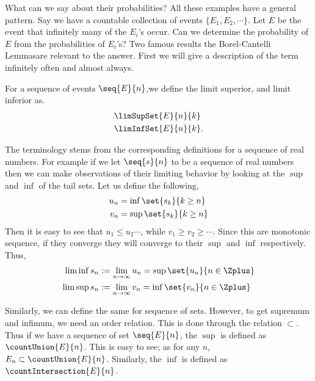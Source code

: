 What can we say about their probabilities? 
All these examples have a general pattern. Say we have a countable collection of events $\lbrace
E_1,E_2,\cdots\rbrace$. Let $E$ be the event that infinitely many of the $E_i$'s occur. Can we
determine the probability of $E$ from the probabilities of $E_i$'s? Two famous results{\textemdash} 
the Borel-Cantelli Lemmas{\textemdash}are relevant to the answer. First we will give a description of
the term infinitely often and almost always.

For a sequence of events $\seq{E}{n}$,we define the limit superior, and limit
inferior as.
\begin{align*}
    &\limSupSet{E}{n}{k} \\
    &\limInfSet{E}{n}{k}.
\end{align*}
\begin{Remark}\label{rmk:limsup_liminf_set}
    The terminology stems from the corresponding definitions for 
    a sequence of real numbers. For example if we let $\seq{s}{n}$ to be
    a sequence of real numbers then we can make observations of their limiting behavior by looking
    at the $\sup$ and $\inf$ of the tail sets. Let us define the following,
    \begin{align*}
	u_n &= \inf\set{s_k}{k\geq n} \\
	v_n &= \sup\set{s_k}{k\geq n} \\
    \end{align*}
    Then it is easy to see that $u_1 \leq u_2 \cdots$, while $v_1 \geq v_2 \geq \cdots$. Since this
    are monotonic sequence, if they converge they will converge to their $\sup$ and $\inf$
    respectively. Thus,
    \begin{align*}
	\liminf s_n & := \lim\limits_{n\to\infty}u_n = \sup\set{u_n}{n\in \Zplus} \\
	\limsup s_n & := \lim\limits_{n\to\infty}v_n = \inf\set{v_n}{n\in \Zplus} \\
    \end{align*}	
    
    Similarly, we can define the same for sequence of sets. However, to get supremum
    and infimum, we need an order relation. This is done through the relation $\subset$. Thus if we
    have a sequence of set $\seq{E}{n}$, the $\sup$ is defined as $\countUnion{E}{n}$. This is easy
    to see; as for any $n$, $E_n \subset \countUnion{E}{n}$. Similarly, the $\inf$ is defined
    as $\countIntersection{E}{n}$.   


\end{Remark}
